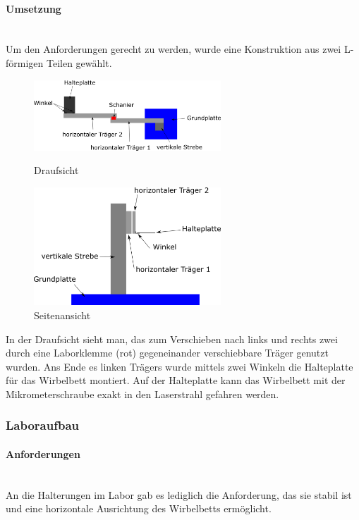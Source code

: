 \paragraph{Umsetzung}
\hfill \\
Um den Anforderungen gerecht zu werden, wurde eine Konstruktion aus zwei L-förmigen Teilen gewählt. 

\begin{figure}[h]
	\begin{minipage}[hbt]{7cm}
		\centering
		\includegraphics[width=7cm]{Halterung_Lichtstreu_Vogel.png}
		\caption[Haltearm Lichtstreuaufbau Draufsicht]{Draufsicht}
	\end{minipage}
	\hfill
	\begin{minipage}[hbt]{7cm}
		\centering
		\includegraphics[width=7cm]{Halterung_Lichtstreu_Seite.png}
		\caption[Haltearm Lichtstreuaufbau Seitenansicht]{Seitenansicht}
	\end{minipage}
\end{figure}


In der Draufsicht sieht man, das zum Verschieben nach links und rechts zwei durch eine Laborklemme (rot) gegeneinander verschiebbare Träger genutzt wurden. Ans Ende es linken Trägers wurde mittels zwei Winkeln die Halteplatte für das Wirbelbett montiert. Auf der Halteplatte kann das Wirbelbett mit der Mikrometerschraube exakt in den Laserstrahl gefahren werden.


\subsubsection{Laboraufbau}

\paragraph{Anforderungen}
\hfill \\
An die Halterungen im Labor gab es lediglich die Anforderung, das sie stabil ist und eine horizontale Ausrichtung des Wirbelbetts ermöglicht.

